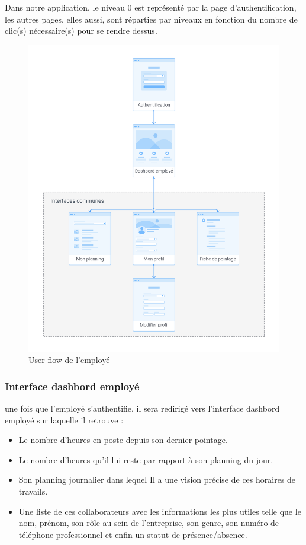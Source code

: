 Dans notre application, le niveau 0 est représenté par la page 
d’authentification, les autres pages, elles aussi, sont réparties par niveaux en 
fonction du nombre de clic(s) nécessaire(s) pour se rendre dessus.
\begin{figure}[h!]
    \vspace{-30pt}
    \centering
    \includegraphics[scale=0.38 ]{images/interface/Espace employe.png}
    \vspace{-20pt}
    \caption{User flow de l'employé}
    \label{fig91}
\end{figure} 

\clearpage
            
\subsubsection*{Interface dashbord employé}
une fois que l’employé s'authentifie, il sera redirigé vers l’interface dashbord 
employé sur laquelle il retrouve :

\begin{itemize}
    \item[\textbullet] Le nombre d’heures en poste depuis son dernier pointage.
    \item[\textbullet] Le nombre d’heures qu’il lui reste par rapport à son 
        planning du jour.
    \item[\textbullet] Son planning journalier dans lequel Il a une vision précise 
        de ces horaires de travails.
    \item[\textbullet] Une liste de ces collaborateurs avec les informations les 
        plus utiles telle que le nom, prénom, son rôle au sein de l’entreprise, 
        son genre, son numéro de téléphone professionnel et enfin un statut de 
        présence/absence.
\end{itemize}

